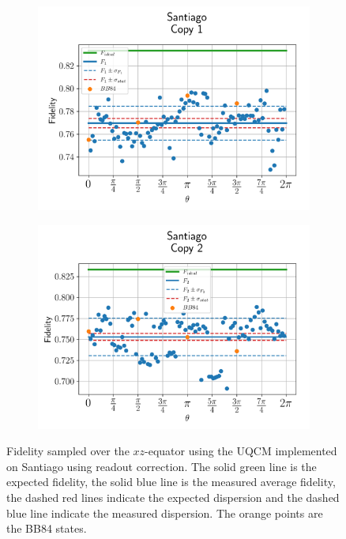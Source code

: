 \begin{figure}[H]
    \centering
    \begin{subfigure}{.45\textwidth}
      \centering
      \includegraphics[width=\textwidth]{Figures/UQCM/IBM/OnlyEquator/results_corrected_santiago_copy1.png}
    \end{subfigure}%
    \begin{subfigure}{.45\textwidth}
      \centering
      \includegraphics[width=\textwidth]{Figures/UQCM/IBM/OnlyEquator/results_corrected_santiago_copy2.png}
    \end{subfigure}
    \caption{Fidelity sampled over the $xz$-equator using the UQCM implemented on Santiago using readout correction. The solid green line is the expected fidelity, the solid blue line is the measured average fidelity, the dashed red lines indicate the expected dispersion and the dashed blue line indicate the measured dispersion. The orange points are the BB84 states.}
    \label{fig:uqcm_eq_san}
\end{figure}

